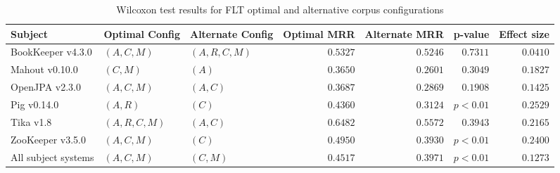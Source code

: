 \begin{landscape}

\begin{table}
\begin{spacing}{1.2}
\centering
\caption{Wilcoxon test results for FLT optimal and alternative corpus configurations}
\label{table:combo-flt-corpus-sweep-wilcox}
\begin{tabular}{lllrrrr}
\toprule
                      Subject &  Optimal Config & Alternate Config & Optimal MRR & Alternate MRR &  p-value & Effect size \\
\midrule
            BookKeeper v4.3.0 &     $(A, C, M)$ &   $(A, R, C, M)$ &    $0.5327$ &      $0.5246$ & $0.7311$ &    $0.0410$ \\
               Mahout v0.10.0 &        $(C, M)$ &            $(A)$ &    $0.3650$ &      $0.2601$ & $0.3049$ &    $0.1827$ \\
               OpenJPA v2.3.0 &     $(A, C, M)$ &         $(A, C)$ &    $0.3687$ &      $0.2869$ & $0.1908$ &    $0.1425$ \\
                  Pig v0.14.0 &        $(A, R)$ &            $(C)$ &    $0.4360$ &      $0.3124$ & $p<0.01$ &    $0.2529$ \\
                    Tika v1.8 &  $(A, R, C, M)$ &         $(A, C)$ &    $0.6482$ &      $0.5572$ & $0.3943$ &    $0.2165$ \\
             ZooKeeper v3.5.0 &     $(A, C, M)$ &            $(C)$ &    $0.4950$ &      $0.3930$ & $p<0.01$ &    $0.2400$ \\
 \midrule
All subject systems &     $(A, C, M)$ &         $(C, M)$ &    $0.4517$ &      $0.3971$ & $p<0.01$ &    $0.1273$ \\
\bottomrule
\end{tabular}

\end{spacing}
\end{table}



\end{landscape}
